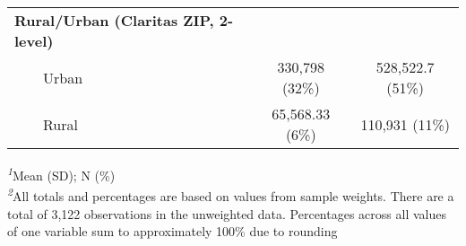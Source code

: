 \begin{table}[t]
\begin{tabular*}{\linewidth}{@{\extracolsep{\fill}}lcc}
{\bfseries Rural/Urban (Claritas ZIP, 2-level)} &  &  \\ 
    Urban & 330,798 (32\%)  & 528,522.7 (51\%)  \\ 
    Rural & 65,568.33 (6\%)  & 110,931 (11\%)  \\ 
\bottomrule
\end{tabular*}
\begin{minipage}{\linewidth}
\textsuperscript{\textit{1}}Mean (SD); N (\%)\\
\textsuperscript{\textit{2}}All totals and percentages are based on values from sample weights. There are a total of 3,122 observations in the unweighted data. Percentages across all values of one variable sum to approximately 100\% due to rounding\\
\end{minipage}
\end{table}

